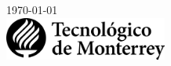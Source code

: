 \documentclass{article}
\begin{document}
\begin{titlepage}


    {\large \today}\\[2cm] %


    \includegraphics[width=0.4\textwidth,height=\textheight,keepaspectratio]{logo-tec-negro.png} %


    \vfill %

\end{titlepage}
\end{document}
